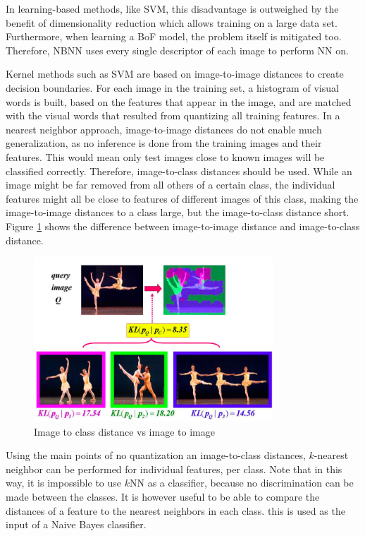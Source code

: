 In learning-based methods, like SVM, this disadvantage is outweighed by the benefit of dimensionality reduction which allows training on a large data set. Furthermore, when learning a BoF model, the problem itself is mitigated too. Therefore, NBNN uses every single descriptor of each image to perform NN on.

Kernel methods such as SVM are based on image-to-image distances to create decision boundaries. For each image in the training set, a histogram of visual words is built, based on the features that appear in the image, and are matched with the visual words that resulted from quantizing all training features. 
In a nearest neighbor approach, image-to-image distances do not enable much generalization, as no inference is done from the training images and their features. This would mean only test images close to known images will be classified correctly. Therefore, image-to-class distances should be used. While an image might be far removed from all others of a certain class, the individual features might all be close to features of different images of this class, making the image-to-image distances to a class large, but the image-to-class distance short. \cite{wang2009learning} Figure \ref{fig:im2im_vs_im2cl} shows the difference between image-to-image distance and image-to-class distance.

\begin{figure}[hbt]
    \centering
    \includegraphics[width=0.8\textwidth]{Im2imVsIm2cl}
    \caption{Image to class distance vs image to image}
    \label{fig:im2im_vs_im2cl}
\end{figure}


Using the main points of no quantization an image-to-class distances, $k$-nearest neighbor can be performed for individual features, per class. Note that in this way, it is impossible to use $k$NN as a classifier, because no discrimination can be made between the classes. It is however useful to be able to compare the distances of a feature to the nearest neighbors in each class. this is used as the input of a Naive Bayes classifier.


